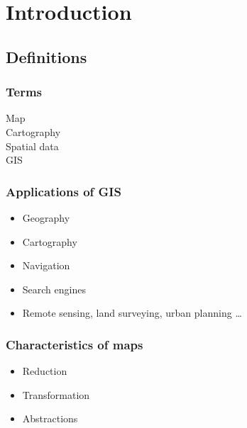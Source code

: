 \documentclass[17pt]{beamer}
\begin{document}
\section{Introduction}

\subsection{Definitions}

\begin{frame}
  \frametitle{Terms}
  \begin{description}
  \item[Map] 
  \item[Cartography] 
  \item[Spatial data] 
  \item[GIS] 
  \end{description}
\end{frame}

\begin{frame}
  \frametitle{Applications of GIS}
  \begin{itemize}
  \item Geography
  \item Cartography
  \item Navigation
  \item Search engines
  \item Remote sensing, land surveying, urban planning \ldots{}
  \end{itemize}
\end{frame}

\begin{frame}
  \frametitle{Characteristics of maps}
  \begin{itemize}
  \item<1-> Reduction 
  \item<3-> Transformation 
  \item<5-> Abstractions 
  \end{itemize}
\end{frame}
\end{document}
